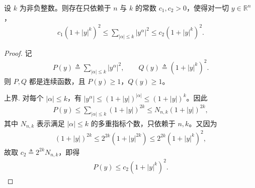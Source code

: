 \documentclass[../../main.tex]{subfiles}
\begin{document}
\begin{lemma}\label{lemma:多项式等价}
设 $k$ 为非负整数。则存在只依赖于 $n$ 与 $k$ 的常数 $c_1,c_2>0$，使得对一切 $y\in\mathbb{R}^n$，
\begin{align}\label{eq:多项式等价}
c_1(1+|y|^k)^2
\leqslant \sum_{|\alpha|\leqslant k}|y^\alpha|^2
\leqslant c_2(1+|y|^k)^2.
\end{align}
\end{lemma}
\begin{proof}
记
\begin{align*}
P(y)\triangleq\sum_{|\alpha|\leqslant k}|y^\alpha|^2,\qquad Q(y)\triangleq(1+|y|^k)^2.
\end{align*}
则 $P,Q$ 都是连续函数，且 $P(y)\geqslant 1$，$Q(y)\geqslant 1$。

{\heiti 上界. } 对每个 $|\alpha|\leqslant k$，有 $|y^\alpha|\leqslant (1+|y|)^{|\alpha|}\leqslant (1+|y|)^k$。因此
\begin{align*}
P(y)\leqslant \sum_{|\alpha|\leqslant k}(1+|y|)^{2k}
\leqslant N_{n,k}(1+|y|)^{2k},
\end{align*}
其中 $N_{n,k}$ 表示满足 $|\alpha|\leqslant k$ 的多重指标个数，只依赖于 $n,k$。又因为
\begin{align*}
(1+|y|)^{2k}\leqslant 2^{2k}(1+|y|^{2k})\leqslant 2^{2k}(1+|y|^k)^2,
\end{align*}
故取 $c_2\triangleq 2^{2k}N_{n,k}$，即得
\begin{align*}
P(y)\leqslant c_2(1+|y|^k)^2.
\end{align*}


\end{proof}
\end{document}
